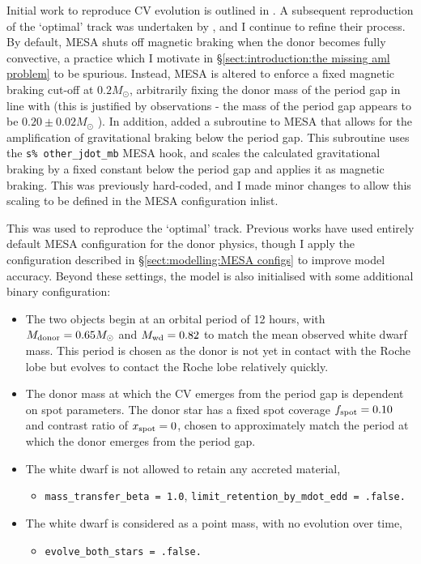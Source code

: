 Initial work to reproduce CV evolution is outlined in \citet{Paxton_2015}. A subsequent reproduction of the `optimal' track was undertaken by \citet{Pala2017a}, and I continue to refine their process.
By default, MESA shuts off magnetic braking when the donor becomes fully convective, a practice which I motivate in \S\ref{sect:introduction:the missing aml problem} to be spurious. Instead, MESA is altered to enforce a fixed magnetic braking cut-off at $0.2 M_\odot$, arbitrarily fixing the donor mass of the period gap in line with \citet{knigge11} (this is justified by observations - the mass of the period gap appears to be $0.20\pm0.02 M_\odot$ \citep{knigge11}).
In addition, \citet{Pala2017a} added a subroutine to MESA that allows for the amplification of gravitational braking below the period gap.
This subroutine uses the \lstinline{s% other_jdot_mb} MESA hook, and scales the calculated gravitational braking by a fixed constant below the period gap and applies it as magnetic braking. This was previously hard-coded, and I made minor changes to allow this scaling to be defined in the MESA configuration inlist.

This was used to reproduce the `optimal' track. Previous works have used entirely default MESA configuration for the donor physics, though I apply the configuration described in \S\ref{sect:modelling:MESA configs} to improve model accuracy. Beyond these settings, the model is also initialised with some additional binary configuration:
\begin{itemize}
    \item The two objects begin at an orbital period of 12 hours, with $M_{\rm donor} = 0.65 M_\odot$ and $M_{\rm wd} = 0.82$ to match the mean observed white dwarf mass. This period is chosen as the donor is not yet in contact with the Roche lobe but evolves to contact the Roche lobe relatively quickly.
    \item The donor mass at which the CV emerges from the period gap is dependent on spot parameters. The donor star has a fixed spot coverage $f_{\rm spot} = 0.10$ and contrast ratio of $x_{\rm spot} = 0$, chosen to approximately match the period at which the donor emerges from the period gap.
    \item The white dwarf is not allowed to retain any accreted material,
    \begin{itemize}
        \item \lstinline{mass_transfer_beta = 1.0}, \lstinline{limit_retention_by_mdot_edd = .false.}
    \end{itemize}
    \item The white dwarf is considered as a point mass, with no evolution over time,
    \begin{itemize}
        \item \lstinline{evolve_both_stars = .false.}
    \end{itemize}
\end{itemize}

